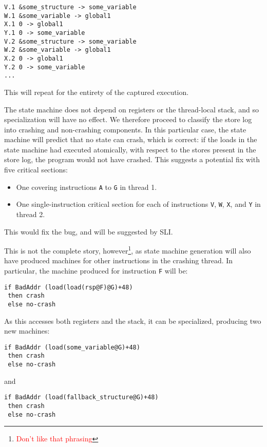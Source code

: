 \documentclass[10pt,twocolumn,preprint,natbib,authoryear]{sigplanconf}
\newcommand{\editorial}[1]{\textcolor{red}{\footnote{\textcolor{red}{#1}}}}
\begin{document}
\begin{verbatim}
V.1 &some_structure -> some_variable
W.1 &some_variable -> global1
X.1 0 -> global1
Y.1 0 -> some_variable
V.2 &some_structure -> some_variable
W.2 &some_variable -> global1
X.2 0 -> global1
Y.2 0 -> some_variable
...
\end{verbatim}

This will repeat for the entirety of the captured execution.

The state machine does not depend on registers or the thread-local
stack, and so specialization will have no effect.  We therefore
proceed to classify the store log into crashing and non-crashing
components.  In this particular case, the state machine will predict
that no state can crash, which is correct: if the loads in the state
machine had executed atomically, with respect to the stores present in
the store log, the program would not have crashed.  This suggests a
potential fix with five critical sections:

\begin{itemize}
\item One covering instructions \verb|A| to \verb|G| in thread 1.
\item One single-instruction critical section for each of instructions
  \verb|V|, \verb|W|, \verb|X|, and \verb|Y| in thread 2.
\end{itemize}

This would fix the bug, and will be suggested by SLI.

This is not the complete story, however\editorial{Don't like that
  phrasing}, as state machine generation will also have produced
machines for other instructions in the crashing thread.  In
particular, the machine produced for instruction \verb|F| will be:

\begin{verbatim}
if BadAddr (load(load(rsp@F)@G)+48)
 then crash
 else no-crash
\end{verbatim}

As this accesses both registers and the stack, it can be specialized,
producing two new machines:

\begin{verbatim}
if BadAddr (load(some_variable@G)+48)
 then crash
 else no-crash
\end{verbatim}

and

\begin{verbatim}
if BadAddr (load(fallback_structure@G)+48)
 then crash
 else no-crash
\end{verbatim}
\end{document}
